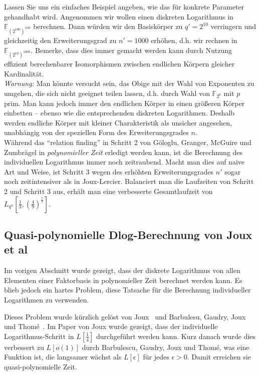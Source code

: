 \begin{refsegment}
Lassen Sie uns ein einfaches Beispiel angeben, wie das für konkrete Parameter gehandhabt wird. Angenommen wir wollen einen diskreten Logarithmus in $\mathbb{F}_{(2^{100})^{100}}$ berechnen. Dann würden wir den Basiskörper zu $q'=2^{10}$ verringern und gleichzeitig den Erweiterungsgrad zu $n'=1000$ erhöhen, d.h. wir rechnen in $\mathbb{F}_{(2^{10})^{1000}}$. Bemerke, dass dies immer gemacht werden kann durch Nutzung effizient berechenbarer Isomorphismen zwischen endlichen Körpern gleicher Kardinalität.\\[0.1cm]

{\em Warnung:} Man könnte versucht sein, das Obige mit der Wahl von Exponenten zu umgehen, die sich nicht geeignet teilen lassen, d.h. durch Wahl von $\mathbb{F}_{2^p}$ mit $p$ prim. Man kann jedoch immer den endlichen Körper in einen größeren Körper einbetten -- ebenso wie die entsprechenden diskreten Logarithmen. Deshalb werden endliche Körper mit kleiner Charakteristik als unsicher angesehen, unabhängig von der speziellen Form des Erweiterungsgrades $n$.\\[0.1cm]

Während das "`relation finding"' in Schritt 2 von G\"ologlu, Granger, McGuire und Zumbr\"agel in {\em polynomieller Zeit} erledigt werden kann, ist die Berechnung des individuellen Logarithmus immer noch zeitraubend. Macht man dies auf naive Art und Weise, ist Schritt 3 wegen des erhöhten Erweiterungsgrades $n'$ sogar noch zeitintensiver als in Joux-Lercier. Balanciert man die Laufzeiten von Schritt 2 und Schritt 3 aus, erhält man eine verbesserte Gesamtlaufzeit von $L_{q^n}[\frac 1 3, (\frac 4 9)^{\frac 1 3}]$.


\subsection{Quasi-polynomielle Dlog-Berechnung von Joux et al}

Im vorigen Abschnitt wurde gezeigt, dass der diskrete Logarithmus von allen Elementen einer Faktorbasis in polynomieller Zeit berechnet werden kann. Es blieb jedoch ein hartes Problem, diese Tatsache für die Berechnung individueller Logarithmen zu verwenden.

Dieses Problem wurde kürzlich gelöst von Joux~\cite{Joux2013} und Barbulesu, Gaudry, Joux und Thom\'e~\cite{BGJT2013}. Im Paper von Joux wurde gezeigt, dass der individuelle Logarithmus-Schritt in $L[\frac 1 4]$ durchgeführt werden kann. Kurz danach wurde dies verbessert zu $L[o(1)]$ durch Barbulescu, Gaudry, Joux und Thom\'e, was eine Funktion ist, die langsamer wächst als $L[\epsilon]$ für jedes $\epsilon > 0$. Damit erreichen sie quasi-polynomielle Zeit.


\end{refsegment}
